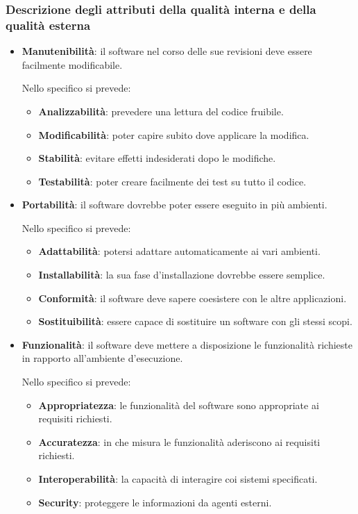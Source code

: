 		\subsubsection{Descrizione degli attributi della qualità interna e della qualità esterna}
		\begin{itemize}
			\item \textbf{Manutenibilità}: il software nel corso delle sue revisioni deve essere facilmente modificabile.
			
			Nello specifico si prevede:
			
			\begin{itemize}
				\item \textbf{Analizzabilità}: prevedere una lettura del codice fruibile.
				\item \textbf{Modificabilità}: poter capire subito dove applicare la modifica.
				\item \textbf{Stabilità}: evitare effetti indesiderati dopo le modifiche.
				\item \textbf{Testabilità}: poter creare facilmente dei test su tutto il codice.
			\end{itemize}
		
			\item \textbf{Portabilità}: il software dovrebbe poter essere eseguito in più ambienti.
			
			Nello specifico si prevede:
			
			\begin{itemize}
				\item \textbf{Adattabilità}: potersi adattare automaticamente ai vari ambienti.
				\item \textbf{Installabilità}: la sua fase d'installazione dovrebbe essere semplice.
				\item \textbf{Conformità}: il software deve sapere coesistere con le altre applicazioni.
				\item \textbf{Sostituibilità}: essere capace di sostituire un software con gli stessi scopi.
			\end{itemize}
			\newpage
			\item \textbf{Funzionalità}: il software deve mettere a disposizione le funzionalità richieste in rapporto all'ambiente d'esecuzione.
			
			Nello specifico si prevede:
			
			\begin{itemize}
				\item \textbf{Appropriatezza}: le funzionalità del software sono appropriate ai requisiti richiesti.
				\item \textbf{Accuratezza}: in che misura le funzionalità aderiscono ai requisiti richiesti.
				\item \textbf{Interoperabilità}: la capacità di interagire coi sistemi specificati.
				\item \textbf{Security}: proteggere le informazioni da agenti esterni.
			\end{itemize}
		

\end{itemize}

